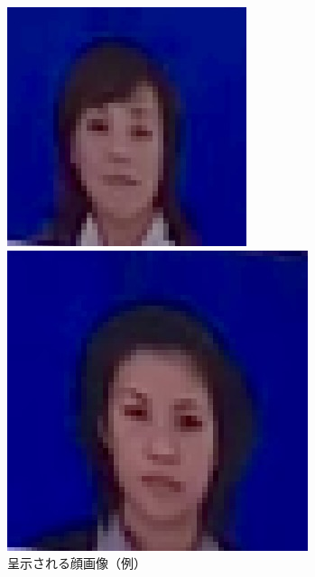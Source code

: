 \begin{figure}
    \centering
    \vspace{-1cm}
    \begin{minipage}{.14\textwidth}
        \centering
        \includegraphics[keepaspectratio,width=\textwidth]{../../12_DataAnalysis/img1.jpeg}
    \end{minipage}
    \begin{minipage}{.14\textwidth}
        \centering
        \includegraphics[keepaspectratio,width=\textwidth]{../../12_DataAnalysis/img2.jpeg}
    \end{minipage}
    \caption{呈示される顔画像（例）}
    \label{fig:顔画像例}
    \vspace{-1cm}
\end{figure}
